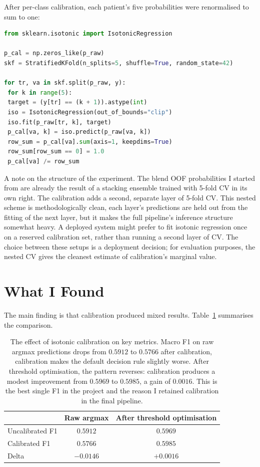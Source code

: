 After per-class calibration, each patient's five probabilities were renormalised to sum to one:
\begin{lstlisting}[language=Python, caption={Per-class isotonic calibration with row renormalisation. The inner loop fits one isotonic regression per ESI class within each cross-validation fold.}]
from sklearn.isotonic import IsotonicRegression

p_cal = np.zeros_like(p_raw)
skf = StratifiedKFold(n_splits=5, shuffle=True, random_state=42)

for tr, va in skf.split(p_raw, y):
 for k in range(5):
 target = (y[tr] == (k + 1)).astype(int)
 iso = IsotonicRegression(out_of_bounds="clip")
 iso.fit(p_raw[tr, k], target)
 p_cal[va, k] = iso.predict(p_raw[va, k])
 row_sum = p_cal[va].sum(axis=1, keepdims=True)
 row_sum[row_sum == 0] = 1.0
 p_cal[va] /= row_sum
\end{lstlisting}

A note on the structure of the experiment. The blend OOF probabilities I started from are already the result of a stacking ensemble trained with 5-fold CV in its own right. The calibration adds a second, separate layer of 5-fold CV. This nested scheme is methodologically clean, each layer's predictions are held out from the fitting of the next layer, but it makes the full pipeline's inference structure somewhat heavy. A deployed system might prefer to fit isotonic regression once on a reserved calibration set, rather than running a second layer of CV. The choice between these setups is a deployment decision; for evaluation purposes, the nested CV gives the cleanest estimate of calibration's marginal value.

\section{What I Found}

The main finding is that calibration produced mixed results. Table~\ref{tab:calibration-results} summarises the comparison.

\begin{table}[htbp]
 \centering
 \caption[Calibration effect on key metrics]{The effect of isotonic calibration on key metrics. Macro F1 on raw argmax predictions drops from $0.5912$ to $0.5766$ after calibration, calibration makes the default decision rule slightly worse. After threshold optimisation, the pattern reverses: calibration produces a modest improvement from $0.5969$ to $0.5985$, a gain of $0.0016$. This is the best single F1 in the project and the reason I retained calibration in the final pipeline.}
 \label{tab:calibration-results}
 \small
 \begin{tabular}{lcc}
 \toprule
 & Raw argmax & After threshold optimisation \\
 \midrule
 Uncalibrated F1 & $0.5912$ & $0.5969$ \\
 Calibrated F1 & $0.5766$ & $0.5985$ \\
 \addlinespace
 Delta & $-0.0146$ & $+0.0016$ \\
 \bottomrule
 \end{tabular}
\end{table}

